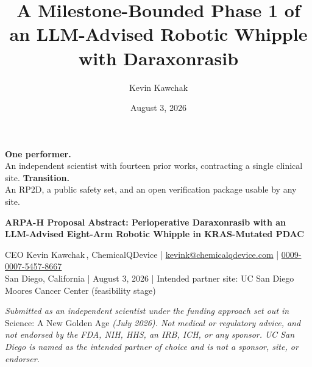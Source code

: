 \documentclass[11pt]{article}
\title{A Milestone-Bounded Phase 1 of an LLM-Advised Robotic Whipple with
Daraxonrasib}
\author{Kevin Kawchak}
\date{August 3, 2026}
\begin{document}
\thispagestyle{plain}

%
{\textbf{\color{protoblue}One performer.}\\[0.1em]An independent scientist with
fourteen prior works, contracting a single clinical site.}%
{\textbf{\color{protoblue}Transition.}\\[0.1em]An RP2D, a public safety set, and
an open verification package usable by any site.}

\vspace{0.2em}

{\raggedright\Large\bfseries\color{protoblue} ARPA-H Proposal Abstract:
Perioperative Daraxonrasib with an LLM-Advised Eight-Arm Robotic Whipple in
KRAS-Mutated PDAC\par}

\vspace{0.25em}
\apprule{0.8pt}
\vspace{0.1em}

\noindent\small CEO Kevin Kawchak\,,
ChemicalQDevice \;|\;
\href{mailto:kevink@chemicalqdevice.com}{kevink@chemicalqdevice.com} \;|\;
\href{https://orcid.org/0009-0007-5457-8667}{0009-0007-5457-8667}\\
San Diego, California \;|\; August 3, 2026 \;|\; Intended partner site: UC San
Diego Moores Cancer Center (feasibility stage)\normalsize\par

\vspace{0.1em}

\noindent\footnotesize\textit{Submitted as an independent scientist under the
funding approach set out in} Science: A New Golden Age \textit{(July 2026). Not
medical or regulatory advice, and not endorsed by the FDA, NIH, HHS, an IRB,
ICH, or any sponsor. UC San Diego is named as the intended partner of choice and
is not a sponsor, site, or endorser.}\normalsize\par

\vspace{-0.1em}
\apprule{0.4pt}







\end{document}
